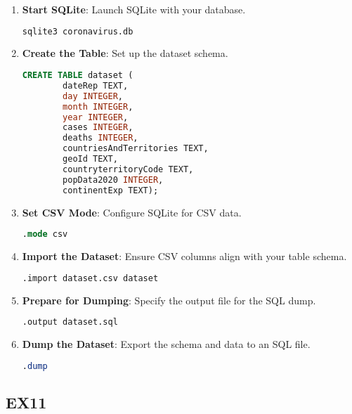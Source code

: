 \documentclass{article}
\begin{document}
\begin{enumerate}
    \item \textbf{Start SQLite}: Launch SQLite with your database.
    \begin{lstlisting}[language=bash]
    sqlite3 coronavirus.db
    \end{lstlisting}

    \item \textbf{Create the Table}: Set up the dataset schema.
    \begin{lstlisting}[language=SQL]
    CREATE TABLE dataset (
        dateRep TEXT,
        day INTEGER,
        month INTEGER, 
        year INTEGER, 
        cases INTEGER,
        deaths INTEGER, 
        countriesAndTerritories TEXT,
        geoId TEXT, 
        countryterritoryCode TEXT,
        popData2020 INTEGER, 
        continentExp TEXT);
    \end{lstlisting}

    \item \textbf{Set CSV Mode}: Configure SQLite for CSV data.
    \begin{lstlisting}[language=SQL]
    .mode csv
    \end{lstlisting}

    \item \textbf{Import the Dataset}: Ensure CSV columns align with your table schema.
    \begin{lstlisting}[language=SQL]
    .import dataset.csv dataset
    \end{lstlisting}

    \item \textbf{Prepare for Dumping}: Specify the output file for the SQL dump.
    \begin{lstlisting}[language=SQL]
    .output dataset.sql
    \end{lstlisting}

    \item \textbf{Dump the Dataset}: Export the schema and data to an SQL file.
    \begin{lstlisting}[language=SQL]
    .dump
    \end{lstlisting}
\end{enumerate}

\subsection{EX11}
\end{document}
